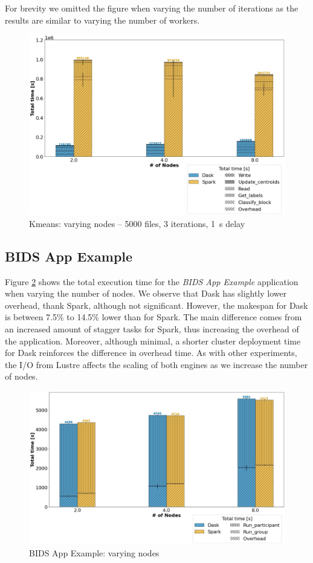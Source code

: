 \documentclass[conference]{IEEEtran}
\begin{document}
For brevity we omitted the figure when varying the number of iterations as the results are similar to varying the number of workers.
\begin{figure}[!t]
	\centering
	\includegraphics[clip,width=\columnwidth]{figures/stacked_kmeans_worker.jpg}
	\caption{Kmeans: varying nodes -- 5000 files, 3 iterations, \SI{1}{\second} delay}
	\label{fig:kmeans_worker}
\end{figure}

\subsection{BIDS App Example}
Figure \ref{fig:bids} shows the total execution time for the \textit{BIDS App Example} application when varying the number of nodes.
We observe that Dask has slightly lower overhead, thank Spark, although not significant.
However, the makespan for Dask is between 7.5\% to 14.5\% lower than for Spark.
The main difference comes from an increased amount of stagger tasks for Spark, thus increasing the overhead of the application.
Moreover, although minimal, a shorter cluster deployment time for Dask reinforces the difference in overhead time.
As with other experiments, the I/O from Lustre affects the scaling of both engines as we increase the number of nodes.
\begin{figure}[!t]
	\centering
	\includegraphics[clip,width=\columnwidth]{figures/stacked_bids.jpg}
	\caption{BIDS App Example: varying nodes}
	\label{fig:bids}
\end{figure}
\end{document}
